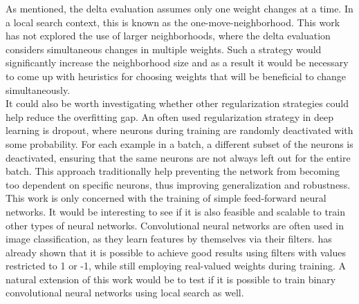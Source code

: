 \noindent As mentioned, the delta evaluation assumes only one weight changes at a time. In a local search context, this is known as the one-move-neighborhood. This work has not explored the use of larger neighborhoods, where the delta evaluation considers simultaneous changes in multiple weights. Such a strategy would significantly increase the neighborhood size and as a result it would be necessary to come up with heuristics for choosing weights that will be beneficial to change simultaneously. \\

\noindent It could also be worth investigating whether other regularization strategies could help reduce the overfitting gap. An often used regularization strategy in deep learning is dropout, where neurons during training are randomly deactivated with some probability. For each example in a batch, a different subset of the neurons is deactivated, ensuring that the same neurons are not always left out for the entire batch. This approach traditionally help preventing the network from becoming too dependent on specific neurons, thus improving generalization and robustness. \\ 

\noindent This work is only concerned with the training of simple feed-forward neural networks. It would be interesting to see if it is also feasible and scalable to train other types of neural networks. Convolutional neural networks are often used in image classification, as they learn features by themselves via their filters. \cite{lin2017} has already shown that it is possible to achieve good results using filters with values restricted to 1 or -1, while still employing real-valued weights during training. A natural extension of this work would be to test if it is possible to train binary convolutional neural networks using local search as well. 



